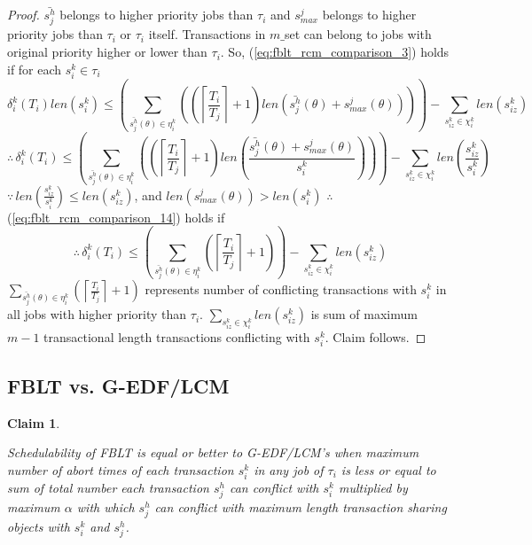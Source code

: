 \documentclass[12pt,english]{report}
\newtheorem{clm}{Claim}
\newtheorem{proof}{Proof}
\begin{document}
\begin{proof}
$\bar{s_{j}^{h}}$ belongs to higher priority jobs than $\tau_{i}$
and $s_{max}^{j}$ belongs to higher priority jobs than $\tau_{i}$
or $\tau_{i}$ itself. Transactions in $m\_$set can belong to jobs
with original priority higher or lower than $\tau_{i}$. So, (\ref{eq:fblt_rcm_comparison_3})
holds if for each $s_{i}^{k}\in\tau_{i}$ 
\begin{equation}
\delta_{i}^{k}(T_{i})len(s_{i}^{k})\le\left(\sum_{\bar{s_{j}^{h}}(\theta)\in\eta_{i}^{k}}\left(\left(\left\lceil \frac{T_{i}}{T_{j}}\right\rceil +1\right)len\left(\bar{s_{j}^{h}}(\theta)+s_{max}^{j}(\theta)\right)\right)\right)-\sum_{s_{iz}^k\in \chi_i^k} len(s_{iz}^{k})\label{eq:fblt_rcm_comparison_5}
\end{equation}
\begin{equation}
\therefore\,\delta_{i}^{k}(T_{i})\le\left(\sum_{\bar{s_{j}^{h}}(\theta)\in\eta_{i}^{k}}\left(\left(\left\lceil \frac{T_{i}}{T_{j}}\right\rceil +1\right)len\left(\frac{\bar{s_{j}^{h}}(\theta)+s_{max}^{j}(\theta)}{s_{i}^{k}}\right)\right)\right)-\sum_{s_{iz}^k \in \chi_i^k} len\left(\frac{s_{iz}^{k}}{s_{i}^{k}}\right)\label{eq:fblt_rcm_comparison_14}
\end{equation}
$\because\, len\left(\frac{s_{iz}^{k}}{s_{i}^{k}}\right)\le len(s_{iz}^{k})$,
and $len(s_{max}^{j}(\theta))>len(s_{i}^{k})$ $\therefore$ (\ref{eq:fblt_rcm_comparison_14})
holds if 
\begin{equation*}
\therefore\,\delta_{i}^{k}(T_{i})\le\left(\sum_{\bar{s_{j}^{h}}(\theta)\in\eta_{i}^{k}}\left(\left\lceil \frac{T_{i}}{T_{j}}\right\rceil +1\right)\right)-\sum_{s_{iz}^k \in \chi_i^k} len\left(s_{iz}^{k}\right)
\end{equation*}
$\sum_{\bar{s_{j}^{h}}(\theta)\in\eta_{i}^{k}}\left(\left\lceil \frac{T_{i}}{T_{j}}\right\rceil +1\right)$
represents number of conflicting transactions with $s_{i}^{k}$ in
all jobs with higher priority than $\tau_{i}$. $\sum_{s_{iz}^k \in \chi_i^k} len\left(s_{iz}^{k}\right)$
is sum of maximum $m-1$ transactional length transactions conflicting
with $s_{i}^{k}$. Claim follows.

\end{proof}

\subsection{FBLT vs. G-EDF/LCM}

\begin{clm}\label{clm:fblt_lcm_edf}

Schedulability of FBLT is equal or better to G-EDF/LCM's when maximum
number of abort times of each transaction $s_{i}^{k}$ in any job
of $\tau_{i}$ is less or equal to sum of total number each transaction
$s_{j}^{h}$ can conflict with $s_{i}^{k}$ multiplied by maximum
$\alpha$ with which $s_{j}^{h}$ can conflict with maximum length
transaction sharing objects with $s_{i}^{k}$ and $s_{j}^{h}$.

\end{clm}
\end{document}
